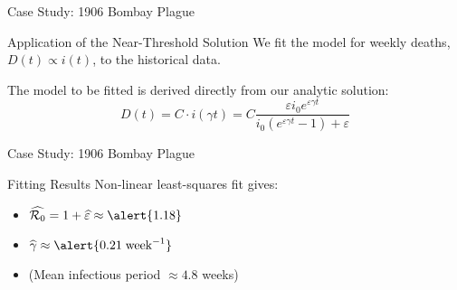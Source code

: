 \documentclass[14pt,aspectratio=169]{beamer}
\newcommand{\RR}{\mathcal{R}_0}
\begin{document}
\begin{frame}{Case Study: 1906 Bombay Plague}
    \begin{block}{Application of the Near-Threshold Solution}
        We fit the model for weekly deaths, $D(t) \propto i(t)$, to the historical data.
    \end{block}
    The model to be fitted is derived directly from our analytic solution:
    \[ D(t) = C \cdot i(\gamma t) = C \frac{\varepsilon i_0 e^{\varepsilon \gamma t}}{i_0(e^{\varepsilon \gamma t}-1)+\varepsilon} \]
\end{frame}
\begin{frame}{Case Study: 1906 Bombay Plague}

    \begin{alertblock}{Fitting Results}
        Non-linear least-squares fit gives:
        \begin{itemize}
            \item $\widehat{\RR} = 1+\widehat{\varepsilon} \approx \alert{1.18}$
            \item $\widehat{\gamma} \approx \alert{0.21\; \text{week}^{-1}}$
            \item (Mean infectious period $\approx 4.8$ weeks)
        \end{itemize}
    \end{alertblock}
\end{frame}
\end{document}
